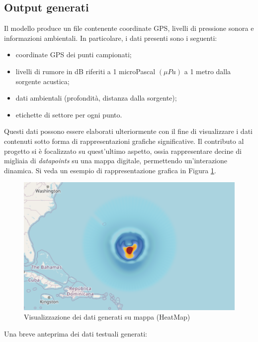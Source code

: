\subsection{Output generati}

Il modello produce un file contenente coordinate GPS, livelli di pressione sonora e informazioni ambientali. In particolare, i dati presenti sono i seguenti:

\begin{itemize}
  \item coordinate GPS dei punti campionati;
  \item livelli di rumore in dB riferiti a 1 microPascal $(\mu Pa)$ a 1 metro dalla sorgente acustica;
  \item dati ambientali (profondità, distanza dalla sorgente);
  \item etichette di settore per ogni punto.
\end{itemize}

Questi dati possono essere elaborati ulteriormente con il fine di visualizzare i dati contenuti sotto forma di rappresentazioni grafiche significative. Il contributo al progetto si è focalizzato su quest'ultimo aspetto, ossia rappresentare decine di migliaia di \textit{datapoints} su una mappa digitale, permettendo un'interazione dinamica. Si veda un esempio di rappresentazione grafica in Figura \ref{fig:preview-heatmap}.

\begin{figure}
    \centering
    \includegraphics[width=0.75\linewidth]{images/heatmap.png}
    \caption{Visualizzazione dei dati generati su mappa (HeatMap)}
    \label{fig:preview-heatmap}
\end{figure}

Una breve anteprima dei dati testuali generati:

